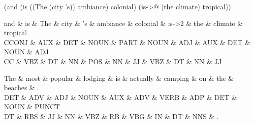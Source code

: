 (and (is ((The (city 's)) ambiance) colonial) (is->@ (the climate) tropical))

\begin{dependency}
\begin{deptext}
and \& is \& The \& city \& 's \& ambiance \& colonial \& is->2 \& the \& climate \& tropical \\
CCONJ \& AUX \& DET \& NOUN \& PART \& NOUN \& ADJ \& AUX \& DET \& NOUN \& ADJ \\
CC \& VBZ \& DT \& NN \& POS \& NN \& JJ \& VBZ \& DT \& NN \& JJ \\
\end{deptext}



\end{dependency}

\begin{dependency}
\begin{deptext}
The \& most \& popular \& lodging \& is \& actually \& camping \& on \& the \& beaches \& . \\
DET \& ADV \& ADJ \& NOUN \& AUX \& ADV \& VERB \& ADP \& DET \& NOUN \& PUNCT \\
DT \& RBS \& JJ \& NN \& VBZ \& RB \& VBG \& IN \& DT \& NNS \& . \\
\end{deptext}



\end{dependency}

